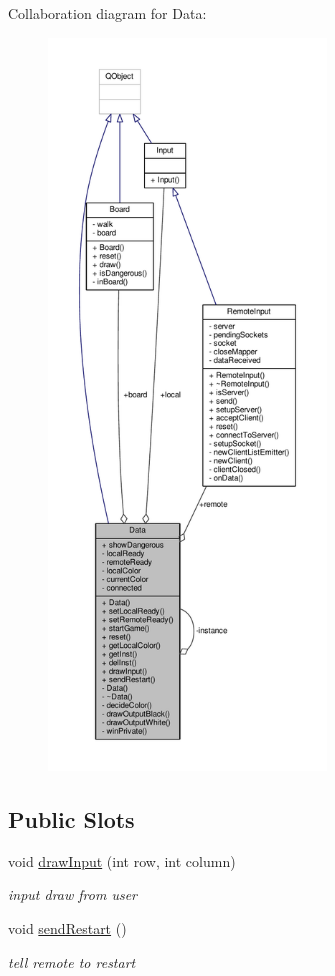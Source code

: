 Collaboration diagram for Data\+:
\nopagebreak
\begin{figure}[H]
\begin{center}
\leavevmode
\includegraphics[height=550pt]{classData__coll__graph}
\end{center}
\end{figure}
\subsection*{Public Slots}
\begin{DoxyCompactItemize}
\item 
void \hyperlink{classData_acc4edfbc7e9cfdf810d01e404b0129de}{draw\+Input} (int row, int column)
\begin{DoxyCompactList}\small\item\em input draw from user \end{DoxyCompactList}\item 
void \hyperlink{classData_aa54baf049c35f1ac45db3b2c9c6b42bf}{send\+Restart} ()
\begin{DoxyCompactList}\small\item\em tell remote to restart \end{DoxyCompactList}\end{DoxyCompactItemize}

